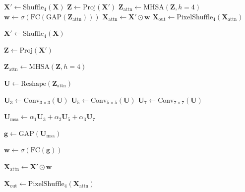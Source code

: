 \documentclass[conference]{IEEEtran}
\begin{document}
\begin{algorithm}[!h]
\caption{Mosaic Transformer Descriptor (MTD) with 4$\times$4 Shuffle + MHSA}

$\mathbf{X}' \leftarrow \text{Shuffle}_{4}(\mathbf{X})$ 
$\mathbf{Z} \leftarrow \text{Proj}(\mathbf{X}')$ 
$\mathbf{Z}_{\text{attn}} \leftarrow \text{MHSA}(\mathbf{Z}, h=4)$\;
$\mathbf{w} \leftarrow \sigma(\text{FC}(\text{GAP}(\mathbf{Z}_{\text{attn}})))$ 
$\mathbf{X}_{\text{attn}} \leftarrow \mathbf{X}' \odot \mathbf{w}$\;
$\mathbf{X}_{\text{out}} \leftarrow \text{PixelShuffle}_{4}(\mathbf{X}_{\text{attn}})$\;
\;
\end{algorithm}
\FloatBarrier
\begin{algorithm}[!t]
\caption{Mosaic Transformer Descriptor (MTD) with 4$\times$4 Shuffle + MHSA + Multi-Scale Aggregation}

$\mathbf{X}' \leftarrow \text{Shuffle}_{4}(\mathbf{X})$

$\mathbf{Z} \leftarrow \text{Proj}(\mathbf{X}')$

$\mathbf{Z}_{\text{attn}} \leftarrow \text{MHSA}(\mathbf{Z}, h=4)$

$\mathbf{U} \leftarrow \text{Reshape}(\mathbf{Z}_{\text{attn}})$

$\mathbf{U}_3 \leftarrow \text{Conv}_{3\times 3}(\mathbf{U})$\;
$\mathbf{U}_5 \leftarrow \text{Conv}_{5\times 5}(\mathbf{U})$\;
$\mathbf{U}_7 \leftarrow \text{Conv}_{7\times 7}(\mathbf{U})$\;

$\mathbf{U}_{\text{msa}} \leftarrow \alpha_1\mathbf{U}_3 + \alpha_2\mathbf{U}_5 + \alpha_3\mathbf{U}_7$

$\mathbf{g} \leftarrow \text{GAP}(\mathbf{U}_{\text{msa}})$

$\mathbf{w} \leftarrow \sigma(\text{FC}(\mathbf{g}))$

$\mathbf{X}_{\text{attn}} \leftarrow \mathbf{X}' \odot \mathbf{w}$\;

$\mathbf{X}_{\text{out}} \leftarrow \text{PixelShuffle}_{4}(\mathbf{X}_{\text{attn}})$

\;
\end{algorithm}
\FloatBarrier
\end{document}
